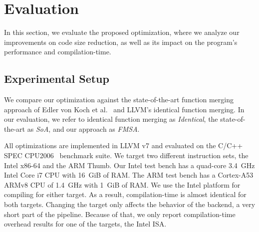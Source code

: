 \section{Evaluation}


In this section, we evaluate the proposed optimization, where we analyze our
improvements on code size reduction, as well as its impact on the program's
performance and compilation-time.



\subsection{Experimental Setup}
We compare our optimization against the state-of-the-art function merging approach of Edler von Koch et al.~\cite{edler14} and LLVM's identical
function merging. In our evaluation, we refer to identical function merging as \textit{Identical}, the state-of-the-art as \textit{SoA}, and our
approach as \textit{FMSA}.

All optimizations are implemented in LLVM v7 and evaluated on the C/C++ SPEC CPU2006~\cite{spec} benchmark suite. We target two different
instruction sets, the Intel x86-64 and the ARM Thumb. Our Intel test bench has a quad-core 3.4~GHz Intel Core i7 CPU with 16~GiB of RAM.
The ARM test bench has a Cortex-A53 ARMv8 CPU of 1.4~GHz with 1~GiB of RAM.
We use the Intel platform for compiling for either target. As a result, compilation-time is almost
identical for both targets. Changing the target only affects the behavior of the backend, a very
short part of the pipeline. Because of that, we only report compilation-time overhead results for
one of the targets, the Intel ISA.

